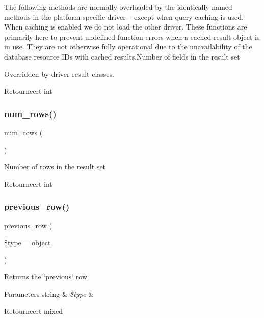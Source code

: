 The following methods are normally overloaded by the identically named methods in the platform-\/specific driver -- except when query caching is used. When caching is enabled we do not load the other driver. These functions are primarily here to prevent undefined function errors when a cached result object is in use. They are not otherwise fully operational due to the unavailability of the database resource I\+Ds with cached results.\+Number of fields in the result set

Overridden by driver result classes.

\begin{DoxyReturn}{Retourneert}
int 
\end{DoxyReturn}
\mbox{\label{class_c_i___d_b__result_a218657c303ee499b97710ab0cd2f5d6e}} 
\subsubsection{\texorpdfstring{num\_rows()}{num\_rows()}}
{\footnotesize\ttfamily num\+\_\+rows (\begin{DoxyParamCaption}{ }\end{DoxyParamCaption})}

Number of rows in the result set

\begin{DoxyReturn}{Retourneert}
int 
\end{DoxyReturn}
\mbox{\label{class_c_i___d_b__result_a458567a19d160a814b41b2964ec192ce}} 
\subsubsection{\texorpdfstring{previous\_row()}{previous\_row()}}
{\footnotesize\ttfamily previous\+\_\+row (\begin{DoxyParamCaption}\item[{}]{\$type = {\ttfamily \textquotesingle{}object\textquotesingle{}} }\end{DoxyParamCaption})}

Returns the \char`\"{}previous\char`\"{} row


\begin{DoxyParams}[1]{Parameters}
string & {\em \$type} & \\
\hline
\end{DoxyParams}
\begin{DoxyReturn}{Retourneert}
mixed 
\end{DoxyReturn}
\mbox{\label{class_c_i___d_b__result_a86bc3a5f1694241cf86a6fd754553884}} 

